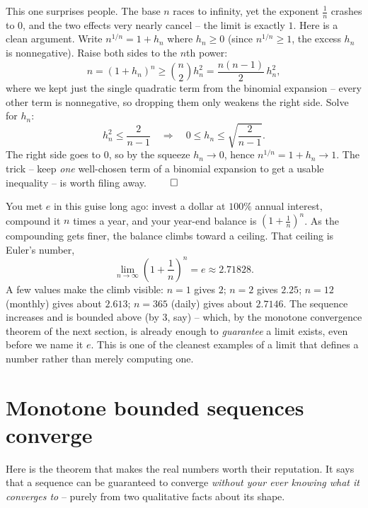\begin{example}
\label{ch28:ex-nroot}
This one surprises people. The base $n$ races to infinity, yet the exponent
$\tfrac1n$ crashes to $0$, and the two effects very nearly cancel -- the limit is
exactly $1$. Here is a clean argument. Write $n^{1/n} = 1 + h_n$ where $h_n \ge 0$
(since $n^{1/n} \ge 1$, the excess $h_n$ is nonnegative). Raise both sides to the
$n$th power:
\[
  n = (1 + h_n)^n \ge \binom{n}{2} h_n^2 = \frac{n(n-1)}{2}\,h_n^2,
\]
where we kept just the single quadratic term from the binomial expansion -- every
other term is nonnegative, so dropping them only weakens the right side. Solve for
$h_n$:
\[
  h_n^2 \le \frac{2}{n-1}
  \quad\Longrightarrow\quad
  0 \le h_n \le \sqrt{\frac{2}{n-1}}.
\]
The right side goes to $0$, so by the squeeze $h_n \to 0$, hence $n^{1/n} = 1 +
h_n \to 1$. The trick -- keep \emph{one} well-chosen term of a binomial expansion
to get a usable inequality -- is worth filing away. $\qed$
\end{example}

\begin{example}
\label{ch28:ex-euler}
You met $e$ in this guise long ago: invest a dollar at $100\%$ annual interest,
compound it $n$ times a year, and your year-end balance is $(1 + \tfrac1n)^n$. As
the compounding gets finer, the balance climbs toward a ceiling. That ceiling is
Euler's number,
\[
  \lim_{n\to\infty}\left(1 + \frac1n\right)^{\!n} = e \approx 2.71828.
\]
A few values make the climb visible: $n=1$ gives $2$; $n=2$ gives $2.25$; $n=12$
(monthly) gives about $2.613$; $n=365$ (daily) gives about $2.7146$. The sequence
increases and is bounded above (by $3$, say) -- which, by the monotone
convergence theorem of the next section, is already enough to \emph{guarantee} a
limit exists, even before we name it $e$. This is one of the cleanest examples of
a limit that defines a number rather than merely computing one.
\end{example}

\section{Monotone bounded sequences converge}
\label{ch28:monotone}

Here is the theorem that makes the real numbers worth their reputation. It says
that a sequence can be guaranteed to converge \emph{without your ever knowing
what it converges to} -- purely from two qualitative facts about its shape.

